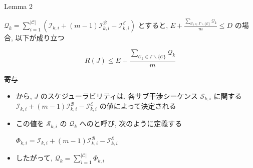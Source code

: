 

\begin{frame}[label=lemma2]{Lemma 2}
    \begin{lemma}[]
        $\mathcal{Q}_{k}=\sum_{i=1}^{|\mathcal{C}|}\left(\mathcal{I}_{k, i}+(m-1) \mathcal{I}_{k, i}^{\mathcal{B}}-\mathcal{I}_{k, i}^{\mathcal{E}}\right)$ とすると,
        $E+\frac{\sum_{\mathcal{C}_{k} \in \Gamma \backslash\{\mathcal{C}\}} \mathcal{Q}_{k}}{m} \leq D$ の場合, 以下が成り立つ

        \begin{equation*}
            R(J) \leq E+\frac{\sum_{\mathcal{C}_{k} \in \Gamma \backslash\{\mathcal{C}\}} \mathcal{Q}_{k}}{m}
        \end{equation*}
    \end{lemma}
\end{frame}

\begin{frame}[label=defPhi]{寄与}
    \begin{itemize}
        \item {} から, $J$ のスケジューラビリティは, 各サブ干渉シーケンス $\mathcal{S}_{k, i}$ に関する $\mathcal{I}_{k, i}+(m-1) \mathcal{I}_{k, i}^{\mathcal{B}}-\mathcal{I}_{k, i}^{\mathcal{E}}$ の値によって決定される
        \item この値を $\mathcal{S}_{k, i}$ の $\mathcal{Q}_{k}$ へのと呼び, 次のように定義する
              \begin{definition}
                  $\Phi_{k, i}=\mathcal{I}_{k, i}+(m-1) \mathcal{I}_{k, i}^{\mathcal{B}}-\mathcal{I}_{k, i}^{\mathcal{E}}$
              \end{definition}
              \vspace{5mm}
        \item したがって, $\mathcal{Q}_{k}=\sum_{i=1}^{|\mathcal{C}|} \Phi_{k, i}$
    \end{itemize}
\end{frame}


